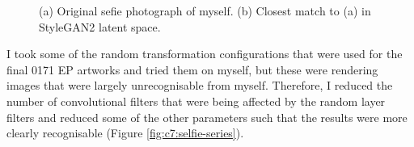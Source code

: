 \begin{figure}[!htbp]
    \hfill
    \hfill
    \caption[Selfie and latent projected into StyleGAN2 latent space comparison]{(a) Original sefie photograph of myself. (b) Closest match to (a) in StyleGAN2 latent space.}
    \label{fig:c7:selfie}
 \end{figure}

I took some of the random transformation configurations that were used for the final 0171 EP artworks and tried them on myself, but these were rendering images that were largely unrecognisable from myself. 
Therefore, I reduced the number of convolutional filters that were being affected by the random layer filters and reduced some of the other parameters such that the results were more clearly recognisable (Figure \ref{fig:c7:selfie-series}).


